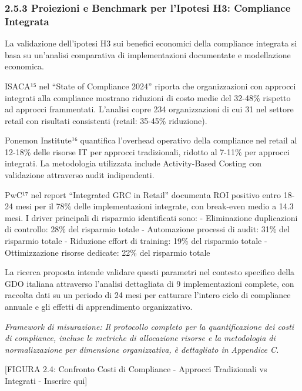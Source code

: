 \documentclass{report}
\begin{document}
\subsubsection{2.5.3 Proiezioni e Benchmark per l'Ipotesi H3: Compliance
Integrata}\label{proiezioni-e-benchmark-per-lipotesi-h3-compliance-integrata}

La validazione dell'ipotesi H3 sui benefici economici della compliance
integrata si basa su un'analisi comparativa di implementazioni
documentate e modellazione economica.

ISACA¹⁵ nel ``State of Compliance 2024'' riporta che organizzazioni con
approcci integrati alla compliance mostrano riduzioni di costo medie del
32-48\% rispetto ad approcci frammentati. L'analisi copre 234
organizzazioni di cui 31 nel settore retail con risultati consistenti
(retail: 35-45\% riduzione).

Ponemon Institute¹⁶ quantifica l'overhead operativo della compliance nel
retail al 12-18\% delle risorse IT per approcci tradizionali, ridotto al
7-11\% per approcci integrati. La metodologia utilizzata include
Activity-Based Costing con validazione attraverso audit indipendenti.

PwC¹⁷ nel report ``Integrated GRC in Retail'' documenta ROI positivo
entro 18-24 mesi per il 78\% delle implementazioni integrate, con
break-even medio a 14.3 mesi. I driver principali di risparmio
identificati sono: - Eliminazione duplicazioni di controllo: 28\% del
risparmio totale - Automazione processi di audit: 31\% del risparmio
totale - Riduzione effort di training: 19\% del risparmio totale -
Ottimizzazione risorse dedicate: 22\% del risparmio totale

La ricerca proposta intende validare questi parametri nel contesto
specifico della GDO italiana attraverso l'analisi dettagliata di 9
implementazioni complete, con raccolta dati su un periodo di 24 mesi per
catturare l'intero ciclo di compliance annuale e gli effetti di
apprendimento organizzativo.

\emph{Framework di misurazione: Il protocollo completo per la
quantificazione dei costi di compliance, incluse le metriche di
allocazione risorse e la metodologia di normalizzazione per dimensione
organizzativa, è dettagliato in Appendice C.}

{[}FIGURA 2.4: Confronto Costi di Compliance - Approcci Tradizionali vs
Integrati - Inserire qui{]}
\end{document}
